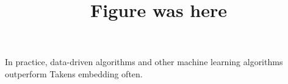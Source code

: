 \documentclass[12 pt]{article}
\makeatletter
\DeclareRobustCommand{\cev}[1]{%
  \mathpalette\do@cev{#1}%
}
\newcommand{\do@cev}[2]{%
  \fix@cev{#1}{+}%
  \reflectbox{$\m@th#1\vec{\reflectbox{$\fix@cev{#1}{-}\m@th#1#2\fix@cev{#1}{+}$}}$}%
  \fix@cev{#1}{-}%
}
\newcommand{\fix@cev}[2]{%
  \ifx#1\displaystyle
    \mkern#20mu
  \else
    \ifx#1\textstyle
      \mkern#20mu
    \else
      \ifx#1\scriptstyle
        \mkern#26mu
      \else
        \mkern#26mu
      \fi
    \fi
  \fi
}
\makeatother
\begin{document}
In practice, data-driven algorithms and other machine learning algorithms outperform Takens embedding often. 


\title{Figure was here}




\end{document}
